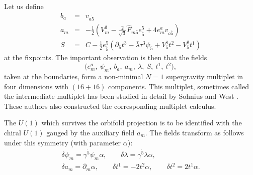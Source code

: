 \documentclass[a4paper,12pt, twoside]{article}
\numberwithin{equation}{section}
\begin{document}
Let us define
\begin{subequations}
\begin{eqnarray}
b_a & = &  v_{a\dot{5}}\\
a_m & = & -\frac{1}{2}( V_m^3 - \frac{2}{\sqrt{3}} 
\widehat{F}_{m5}e^5_{\dot{5}}+4e_m^av_{a\dot{5}})\\
S & = & C-\frac{1}{2}e_{\dot{5}}^5(\partial_5 
t^3-\bar{\lambda}\tau^3\psi_5+V_5^1 t^2-V_5^2t^1)
\end{eqnarray}\label{wichtig1}
\end{subequations}
at the fixpoints. The important observation is then that the fields 
\[
\big( e_m^a,~ \psi_m,~ b_a,~ a_m,~ \lambda,~ S, ~t^1,~t^2\big),
\]
taken at the boundaries, form a non-minimal $N=1$ supergravity 
multiplet in four dimensions with $(16+16)$ components. This multiplet, 
sometimes called the intermediate multiplet has been studied in detail by 
Sohnius and West \cite{Sohnius:1983xs}. These authors also constructed the 
corresponding multiplet calculus.

The $U(1)$ which survives the orbifold projection is to be identified 
with the chiral $U(1)$ gauged by the auxiliary field $a_m$. The fields 
transform as follows under this symmetry (with parameter $\alpha$):
\begin{gather*}
\delta\psi_m=\gamma^{\dot{5}}\psi_m\alpha,\qquad 
\delta\lambda=\gamma^{\dot{5}}\lambda\alpha,\\
\delta a_m=\partial_m\alpha,\qquad \delta t^1=-2t^2\alpha,\qquad \delta 
t^2=2t^1\alpha.
\end{gather*}
\end{document}

